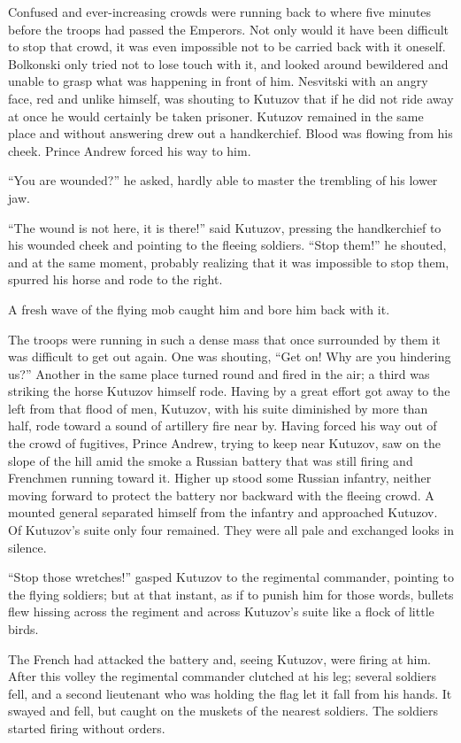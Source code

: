 Confused and ever-increasing crowds were running back to where
five minutes before the troops had passed the Emperors. Not only
would it have been difficult to stop that crowd, it was even
impossible not to be carried back with it oneself. Bolkonski only
tried not to lose touch with it, and looked around bewildered and
unable to grasp what was happening in front of him. Nesvitski
with an angry face, red and unlike himself, was shouting to
Kutuzov that if he did not ride away at once he would certainly
be taken prisoner. Kutuzov remained in the same place and without
answering drew out a handkerchief. Blood was flowing from his
cheek. Prince Andrew forced his way to him.

``You are wounded?'' he asked, hardly able to master the
trembling of his lower jaw.

``The wound is not here, it is there!'' said Kutuzov, pressing
the handkerchief to his wounded cheek and pointing to the fleeing
soldiers.  ``Stop them!'' he shouted, and at the same moment,
probably realizing that it was impossible to stop them, spurred
his horse and rode to the right.

A fresh wave of the flying mob caught him and bore him back with
it.

The troops were running in such a dense mass that once surrounded
by them it was difficult to get out again. One was shouting,
``Get on! Why are you hindering us?'' Another in the same place
turned round and fired in the air; a third was striking the horse
Kutuzov himself rode. Having by a great effort got away to the
left from that flood of men, Kutuzov, with his suite diminished
by more than half, rode toward a sound of artillery fire near
by. Having forced his way out of the crowd of fugitives, Prince
Andrew, trying to keep near Kutuzov, saw on the slope of the hill
amid the smoke a Russian battery that was still firing and
Frenchmen running toward it. Higher up stood some Russian
infantry, neither moving forward to protect the battery nor
backward with the fleeing crowd. A mounted general separated
himself from the infantry and approached Kutuzov. Of Kutuzov's
suite only four remained. They were all pale and exchanged looks
in silence.

``Stop those wretches!'' gasped Kutuzov to the regimental
commander, pointing to the flying soldiers; but at that instant,
as if to punish him for those words, bullets flew hissing across
the regiment and across Kutuzov's suite like a flock of little
birds.

The French had attacked the battery and, seeing Kutuzov, were
firing at him. After this volley the regimental commander
clutched at his leg; several soldiers fell, and a second
lieutenant who was holding the flag let it fall from his
hands. It swayed and fell, but caught on the muskets of the
nearest soldiers. The soldiers started firing without orders.

